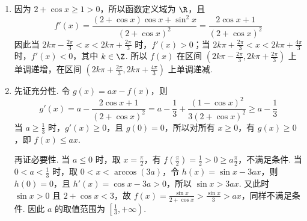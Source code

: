 \begin{solution}
\begin{enumerate}
\item 因为 \(2+\cos x\geqslant1>0\)，所以函数定义域为 \(\R\)，且
\[
f'(x)=\frac{(2+\cos x)\cos x+\sin^2x}{(2+\cos x)^2}=\frac{2\cos x+1}{(2+\cos x)^2}
\]
因此当 \(2k\pi-\frac{2\pi}{3}<x<2k\pi+\frac{2\pi}{3}\) 时，\(f'(x)>0\)；当 \(2k\pi+\frac{2\pi}{3}<x<2k\pi+\frac{4\pi}{3}\) 时，\(f'(x)<0\)，其中 \(k\in\Z\). 所以 \(f(x)\) 在区间 \(\left(2k\pi-\frac{2\pi}{3},2k\pi+\frac{2\pi}{3}\right)\) 上单调递增，在区间 \(\left(2k\pi+\frac{2\pi}{3},2k\pi+\frac{4\pi}{3}\right)\) 上单调递减.
\item 先证充分性. 令 \(g(x)=ax-f(x)\)，则
\[
g'(x)=a-\frac{2\cos x+1}{(2+\cos x)^2}=a-\frac13+\frac{(1-\cos x)^2}{3(2+\cos x)^2}\geqslant a-\frac13
\]
当 \(a\geqslant\frac13\) 时，\(g'(x)\geqslant0\)，且 \(g(0)=0\)，所以对所有 \(x\geqslant0\)，有 \(g(x)\geqslant0\)，即 \(f(x)\leqslant ax\).

再证必要性. 当 \(a\leqslant0\) 时，取 \(x=\frac\pi2\)，有 \(f\left(\frac\pi2\right)=\frac12>0\geqslant a\frac\pi2\)，不满足条件. 当 \(0<a<\frac13\) 时，取 \(0<x<\arccos(3a)\)，令 \(h(x)=\sin x-3ax\)，则 \(h(0)=0\)，且 \(h'(x)=\cos x-3a>0\)，所以 \(\sin x>3ax\). 又此时 \(\sin x>0\) 且 \(2+\cos x<3\)，故 \(f(x)=\frac{\sin x}{2+\cos x}>\frac{\sin x}{3}>ax\)，同样不满足条件. 因此 \(a\) 的取值范围为 \(\left[\frac13,+\infty\right)\).
\end{enumerate}
\end{solution}
